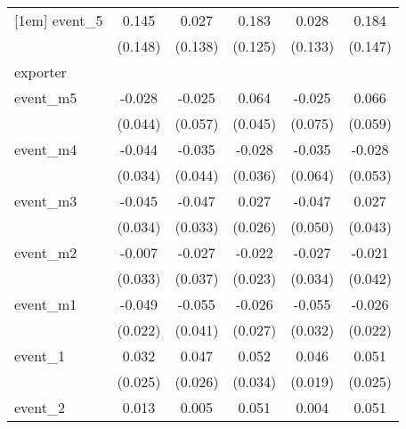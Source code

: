 {\begin{tabular}{l*{5}{c}}
[1em]
event\_5     &       0.145         &       0.027         &       0.183         &       0.028         &       0.184         \\
            &     (0.148)         &     (0.138)         &     (0.125)         &     (0.133)         &     (0.147)         \\
\hline
exporter    &                     &                     &                     &                     &                     \\
event\_m5    &      -0.028         &      -0.025         &       0.064         &      -0.025         &       0.066         \\
            &     (0.044)         &     (0.057)         &     (0.045)         &     (0.075)         &     (0.059)         \\
[1em]
event\_m4    &      -0.044         &      -0.035         &      -0.028         &      -0.035         &      -0.028         \\
            &     (0.034)         &     (0.044)         &     (0.036)         &     (0.064)         &     (0.053)         \\
[1em]
event\_m3    &      -0.045         &      -0.047         &       0.027         &      -0.047         &       0.027         \\
            &     (0.034)         &     (0.033)         &     (0.026)         &     (0.050)         &     (0.043)         \\
[1em]
event\_m2    &      -0.007         &      -0.027         &      -0.022         &      -0.027         &      -0.021         \\
            &     (0.033)         &     (0.037)         &     (0.023)         &     (0.034)         &     (0.042)         \\
[1em]
event\_m1    &      -0.049\sym{*}  &      -0.055         &      -0.026         &      -0.055         &      -0.026         \\
            &     (0.022)         &     (0.041)         &     (0.027)         &     (0.032)         &     (0.022)         \\
[1em]
event\_1     &       0.032         &       0.047         &       0.052         &       0.046\sym{*}  &       0.051\sym{*}  \\
            &     (0.025)         &     (0.026)         &     (0.034)         &     (0.019)         &     (0.025)         \\
[1em]
event\_2     &       0.013         &       0.005         &       0.051         &       0.004         &       0.051         \\

\end{tabular}}
